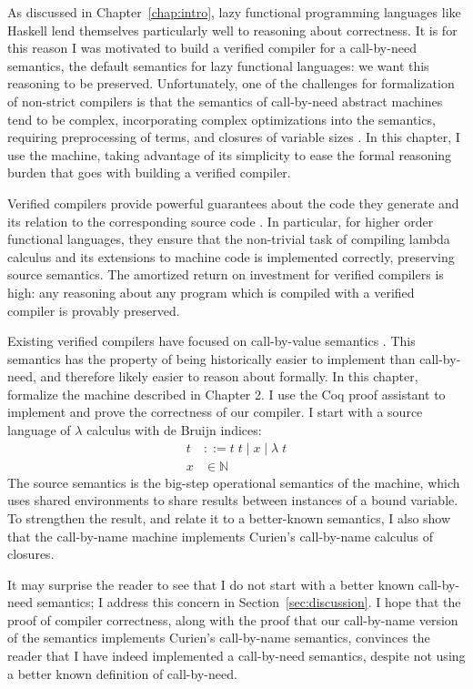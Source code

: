 \label{sec:introduction}
As discussed in Chapter~\ref{chap:intro}, lazy functional programming languages
like Haskell lend themselves particularly well to reasoning about correctness.
It is for this reason I was motivated to build a verified compiler for a
call-by-need semantics, the default semantics for lazy functional languages: we
want this reasoning to be preserved.  Unfortunately, one of the challenges for
formalization of non-strict compilers is that the semantics of call-by-need
abstract machines tend to be complex, incorporating complex optimizations into
the semantics, requiring preprocessing of terms, and closures of variable sizes
\cite{jonesstg, TIM}.  In this chapter, I use the \ce machine, taking advantage
of its simplicity to ease the formal reasoning burden that goes with building a
verified compiler.

Verified compilers provide powerful guarantees about the code they generate and
its relation to the corresponding source code \cite{chlipala2007certified,
leroy2012compcert, cakeml14}.  In particular, for higher order functional
languages, they ensure that the non-trivial task of compiling lambda
calculus and its extensions to machine code is implemented correctly,
preserving source semantics. The amortized return on investment for verified
compilers is high: any reasoning about any program which is compiled with a
verified compiler is provably preserved. 

Existing verified compilers have focused on call-by-value semantics
\cite{chlipala2007certified, leroy2012compcert, cakeml14}. This semantics has
the property of being historically easier to implement than call-by-need, and
therefore likely easier to reason about formally. In this chapter, formalize the
\ce machine described in Chapter 2. I use the Coq proof assistant
\cite{barras1997coq} to implement and prove the correctness of our compiler. I 
start with a source language of $\lambda$ calculus with de Bruijn indices:
\begin{align*}
 t &::= t \; t \; | \; x \; | \;  \lambda \; t \\
 x &\in \mathbb{N}
\end{align*}
The source semantics is the big-step operational semantics of the \ce 
machine, which uses shared environments to share results between instances of a
bound variable. To strengthen the result, and relate it to a better-known
semantics, I also show that the call-by-name \ce machine implements
Curien's call-by-name calculus of closures. 

It may surprise the reader to see that I do not start with a better known
call-by-need semantics; I address this concern in
Section~\ref{sec:discussion}. I hope that the proof of compiler correctness,
along with the proof that our call-by-name version of the semantics implements
Curien's call-by-name semantics, convinces the reader that I have indeed
implemented a call-by-need semantics, despite not using a better known
definition of call-by-need. 

